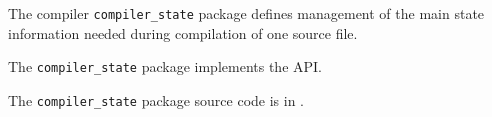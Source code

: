 
The compiler {\tt compiler\_state} package defines management of the main 
state information needed during compilation of one source file.

The {\tt compiler\_state} package implements the  API.

The {\tt compiler\_state} package source code is in .




